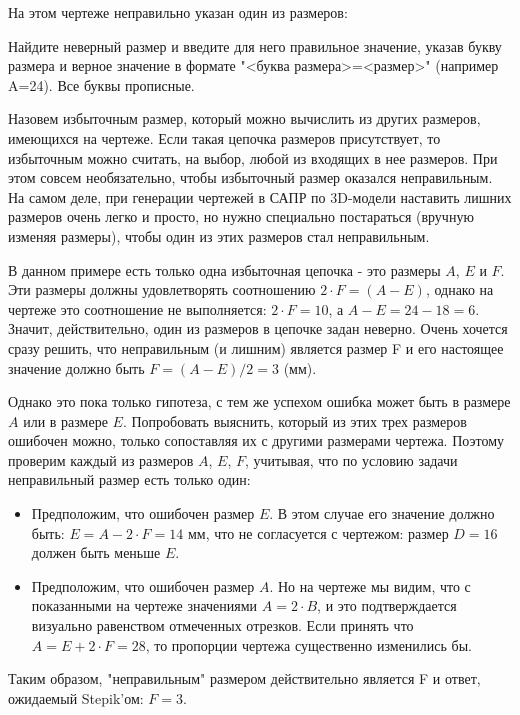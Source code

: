 
На этом чертеже неправильно указан один из размеров:


Найдите неверный размер и введите для него правильное значение, указав букву размера и верное значение в формате "<буква размера>=<размер>" (например A=24).
Все буквы прописные.


\solutionSection

Назовем избыточным размер, который можно вычислить из других размеров, имеющихся на чертеже. Если такая цепочка размеров присутствует, то избыточным можно считать, на выбор, любой из входящих в нее размеров.  При этом совсем необязательно, чтобы избыточный размер оказался неправильным.  На самом деле, при генерации чертежей в САПР  по 3D-модели наставить лишних размеров очень легко и просто, но нужно специально постараться (вручную изменяя размеры), чтобы один из этих размеров стал неправильным.

В данном примере есть только одна избыточная цепочка - это размеры $A$, $E$ и $F$.  Эти размеры должны удовлетворять соотношению $2 \cdot F = (A-E)$,  однако на чертеже это соотношение не выполняется: $ 2 \cdot F = 10$, а  $A-E=24-18=6$.  Значит, действительно, один из размеров в цепочке задан неверно.   Очень хочется сразу решить, что неправильным (и лишним) является размер F и его настоящее значение должно быть $F=(A-E)/2 = 3$ (мм).

Однако это пока только гипотеза,  с тем же успехом ошибка может быть в размере $A$ или в размере $E$. Попробовать выяснить, который из этих трех размеров ошибочен можно, только сопоставляя их с другими размерами чертежа. Поэтому проверим каждый из размеров $A$, $E$, $F$,  учитывая, что по условию задачи неправильный размер есть только один:
\begin{itemize}
    \item Предположим, что ошибочен размер $E$. В этом случае его значение должно быть: $E = A - 2 \cdot F = 14$ мм, что не согласуется с чертежом: размер $D=16$ должен быть меньше $E$. 
    \item Предположим, что ошибочен размер $A$. Но на чертеже мы видим, что с показанными на чертеже значениями $A=2 \cdot B$, и это подтверждается визуально равенством отмеченных отрезков. Если принять что $A = E + 2 \cdot F = 28$, то пропорции чертежа существенно изменились бы.
\end{itemize}


Таким образом, "неправильным" размером действительно является F и ответ, ожидаемый Stepik'ом: $F=3$.

